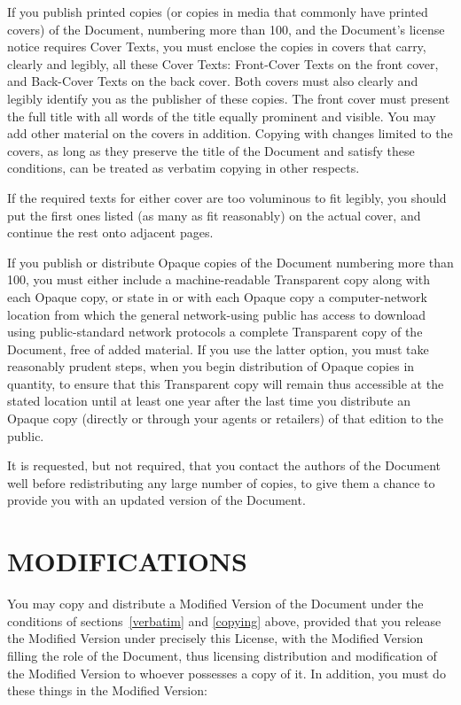 \documentclass[10pt,a4paper,titlepage,twoside,openright]{report}
\begin{document}
If you publish printed copies (or copies in media that commonly have
printed covers) of the Document, numbering more than 100, and the
Document's license notice requires Cover Texts, you must enclose the
copies in covers that carry, clearly and legibly, all these Cover
Texts: Front-Cover Texts on the front cover, and Back-Cover Texts on
the back cover.  Both covers must also clearly and legibly identify
you as the publisher of these copies.  The front cover must present
the full title with all words of the title equally prominent and
visible.  You may add other material on the covers in addition.
Copying with changes limited to the covers, as long as they preserve
the title of the Document and satisfy these conditions, can be treated
as verbatim copying in other respects.

If the required texts for either cover are too voluminous to fit
legibly, you should put the first ones listed (as many as fit
reasonably) on the actual cover, and continue the rest onto adjacent
pages.

If you publish or distribute Opaque copies of the Document numbering
more than 100, you must either include a machine-readable Transparent
copy along with each Opaque copy, or state in or with each Opaque copy
a computer-network location from which the general network-using
public has access to download using public-standard network protocols
a complete Transparent copy of the Document, free of added material.
If you use the latter option, you must take reasonably prudent steps,
when you begin distribution of Opaque copies in quantity, to ensure
that this Transparent copy will remain thus accessible at the stated
location until at least one year after the last time you distribute an
Opaque copy (directly or through your agents or retailers) of that
edition to the public.

It is requested, but not required, that you contact the authors of the
Document well before redistributing any large number of copies, to give
them a chance to provide you with an updated version of the Document.


\section*{MODIFICATIONS}
\label{modifications}

You may copy and distribute a Modified Version of the Document under
the conditions of sections~\ref{verbatim} and \ref{copying} above,
provided that you release
the Modified Version under precisely this License, with the Modified
Version filling the role of the Document, thus licensing distribution
and modification of the Modified Version to whoever possesses a copy
of it.  In addition, you must do these things in the Modified Version:
\end{document}
